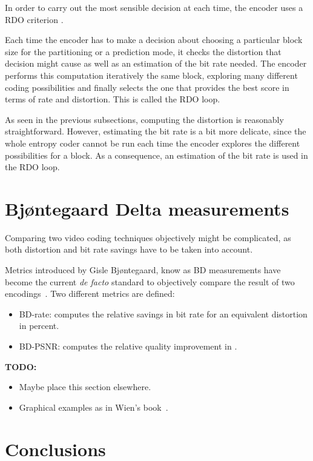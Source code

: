 \documentclass[11pt,a4paper,openright,twoside]{book}
\providecommand{\todo}[1]{
	\begin{center}
		\colorbox{almostwhite}{
			\begin{minipage}{0.85\linewidth}
				\textbf{TODO:} #1
			\end{minipage}
		}
	\end{center}
}
\numberwithin{equation}{section} %
\begin{document}
In order to carry out the most sensible decision at each time, the
encoder uses a \ac{RDO} criterion
\cite{sullivan-98-rdo-video-compression}.

Each time the encoder has to make a decision about choosing a
particular block size for the partitioning or a prediction mode, it
checks the distortion that decision might cause as well as an estimation
of the bit rate needed.
The encoder performs this computation iteratively the same block,
exploring many different coding possibilities and finally selects the
one that provides the best score in terms of rate and distortion.
This is called the \ac{RDO} loop.

As seen in the previous subsections, computing the distortion is
reasonably straightforward.
However, estimating the bit rate is a bit more delicate, since the whole
entropy coder cannot be run each time the encoder explores the different
possibilities for a block.
As a consequence, an estimation of the bit rate is used in the \ac{RDO}
loop.

\section{Bj{\o}ntegaard Delta measurements}
\label{sub:bjontegaard_delta_measurements}

Comparing two video coding techniques objectively might be complicated,
as both distortion and bit rate savings have to be taken into account.

Metrics introduced by Gisle Bj{\o}ntegaard, know as \ac{BD} measurements
have become the current \emph{de facto} standard to objectively compare
the result of two encodings~\cite{VCEG-M33,VCEG-AI11}.
Two different metrics are defined:
\begin{itemize}
	\item \ac{BD}-rate: computes the relative savings in bit rate for an
		equivalent distortion in percent.
	\item \ac{BD}-\ac{PSNR}: computes the relative quality improvement
		in \deci\bel.
\end{itemize}

\todo{
\begin{itemize}
	\item Maybe place this section elsewhere.
	\item Graphical examples as in Wien's book~\cite{wien-15-hevc}.
\end{itemize}
}

\section{Conclusions}
\label{sec:conclusions_video_coding}
\end{document}
